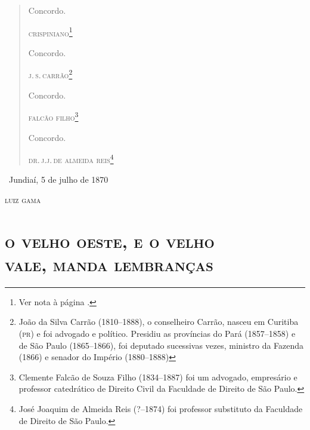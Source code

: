 \begin{quote}
\noindent{}Concordo.

\noindent\textsc{crispiniano}\footnote{Ver nota à página \pageref{crispiniano}.}\medskip

\noindent{}Concordo.

\noindent\textsc{j.\,s.\,carrão}\footnote{João da Silva Carrão (1810--1888), o
  conselheiro Carrão, nasceu em Curitiba (\textsc{pr}) e foi advogado e político.
  Presidiu as províncias do Pará (1857--1858) e de São Paulo (1865--1866),
  foi deputado sucessivas vezes, ministro da Fazenda (1866) e senador do
  Império (1880--1888)}\medskip

\noindent{}Concordo.

\noindent\textsc{falcão filho}\footnote{Clemente Falcão de Souza Filho
  (1834--1887) foi um advogado, empresário e professor catedrático de
  Direito Civil da Faculdade de Direito de São Paulo.}\medskip

\noindent{}Concordo.

\noindent\textsc{dr.\,j.j.\,de almeida reis}\footnote{José Joaquim de Almeida Reis
  (?--1874) foi professor substituto da Faculdade de Direito de São
  Paulo.}
\end{quote}

\hfill\ Jundiaí, 5 de julho de 1870\smallskip

\hfill\textsc{luiz gama}

\pagebreak

\begingroup\makeatletter\@openrightfalse
\part[O velho oeste, e o velho vale, manda lembranças]{\textsc{o velho oeste, e o velho\\ vale, manda lembranças}}

\mbox{}\vfill
\thispagestyle{empty}

